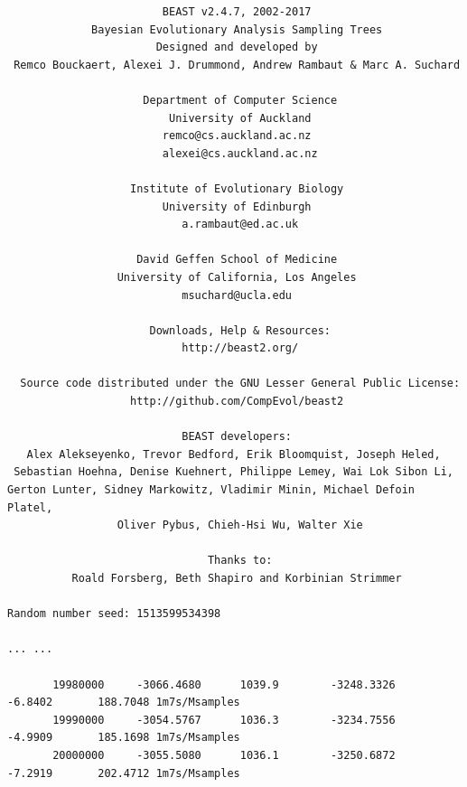 \documentclass[11pt]{article}
\begin{document}
{\tiny   
\begin{verbatim}
                        BEAST v2.4.7, 2002-2017
             Bayesian Evolutionary Analysis Sampling Trees
                       Designed and developed by
 Remco Bouckaert, Alexei J. Drummond, Andrew Rambaut & Marc A. Suchard
                                    
                     Department of Computer Science
                         University of Auckland
                        remco@cs.auckland.ac.nz
                        alexei@cs.auckland.ac.nz
                                    
                   Institute of Evolutionary Biology
                        University of Edinburgh
                           a.rambaut@ed.ac.uk
                                    
                    David Geffen School of Medicine
                 University of California, Los Angeles
                           msuchard@ucla.edu
                                    
                      Downloads, Help & Resources:
                           http://beast2.org/
                                    
  Source code distributed under the GNU Lesser General Public License:
                   http://github.com/CompEvol/beast2
                                    
                           BEAST developers:
   Alex Alekseyenko, Trevor Bedford, Erik Bloomquist, Joseph Heled, 
 Sebastian Hoehna, Denise Kuehnert, Philippe Lemey, Wai Lok Sibon Li, 
Gerton Lunter, Sidney Markowitz, Vladimir Minin, Michael Defoin Platel, 
                 Oliver Pybus, Chieh-Hsi Wu, Walter Xie
                                    
                               Thanks to:
          Roald Forsberg, Beth Shapiro and Korbinian Strimmer

Random number seed: 1513599534398

... ...

       19980000     -3066.4680      1039.9        -3248.3326        -6.8402       188.7048 1m7s/Msamples
       19990000     -3054.5767      1036.3        -3234.7556        -4.9909       185.1698 1m7s/Msamples
       20000000     -3055.5080      1036.1        -3250.6872        -7.2919       202.4712 1m7s/Msamples


\end{verbatim}}
\end{document}

